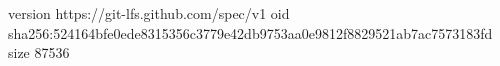version https://git-lfs.github.com/spec/v1
oid sha256:524164bfe0ede8315356c3779e42db9753aa0e9812f8829521ab7ac7573183fd
size 87536
